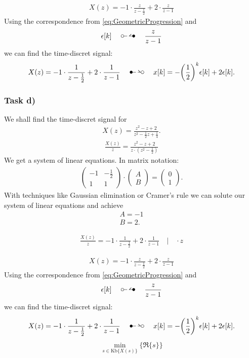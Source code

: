 \begin{align}
	X(z)=-1\cdot\frac{z}{z-\frac{1}{2}}+2\cdot\frac{z}{z-1}
\end{align}
Using the correspondence from \ref{eq:GeometricProgression} and 
\begin{align}
	\epsilon[k]\quad\ztransf\quad\frac{z}{z-1}
\end{align}
we can find the time-discret signal:
\begin{align}
	X(z)=-1\cdot\frac{1}{z-\frac{1}{2}}+2\cdot\frac{1}{z-1}\quad\Ztransf\quad x[k]=-\bigg(\frac{1}{2}\bigg)^k\epsilon[k]+2\epsilon[k].
\end{align}
\subsubsection{Task d)}
We shall find the time-discret signal for
\begin{align}
	X(z)=\frac{z^2-z+2}{z^2-\frac{1}{2}z+\frac{1}{4}}.
\end{align}
\begin{align}
	\frac{X(z)}{z}=\frac{z^2-z+2}{z\cdot(z^2-\frac{1}{2})}
\end{align}
We get a system of linear equations. In matrix notation:
\begin{align}
	\begin{pmatrix}
		-1 & -\frac{1}{2} \\
		1 & 1
	\end{pmatrix}
	\cdot
	\begin{pmatrix}
		A \\ B
	\end{pmatrix}
	=
	\begin{pmatrix}
		0 \\ 1
	\end{pmatrix}.
\end{align}
With techniques like Gaussian elimination or Cramer's rule we can solute our system of linear equations and achieve
\begin{align}
	A = -1 \nonumber \\
	B = 2.
\end{align}

\begin{align}
	\frac{X(z)}{z}=-1\cdot\frac{1}{z-\frac{1}{2}}+2\cdot\frac{1}{z-1} \quad\Bigg | \quad \cdot z
\end{align}

\begin{align}
	X(z)=-1\cdot\frac{z}{z-\frac{1}{2}}+2\cdot\frac{z}{z-1}
\end{align}
Using the correspondence from \ref{eq:GeometricProgression} and 
\begin{align}
	\epsilon[k]\quad\ztransf\quad\frac{z}{z-1}
\end{align}
we can find the time-discret signal:
\begin{align}
	X(z)=-1\cdot\frac{1}{z-\frac{1}{2}}+2\cdot\frac{1}{z-1}\quad\Ztransf\quad x[k]=-\bigg(\frac{1}{2}\bigg)^k\epsilon[k]+2\epsilon[k].
\end{align}
\begin{align}
	\underset{s \in \mathrm{Kb} \{ X(s) \} }{\min}\big \{ \Re \{ s \} \big \}
\end{align}

